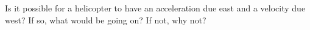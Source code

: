 Is it possible for a helicopter to have an acceleration
        due east and a velocity due west? If so, what would be going
        on? If not, why not?
